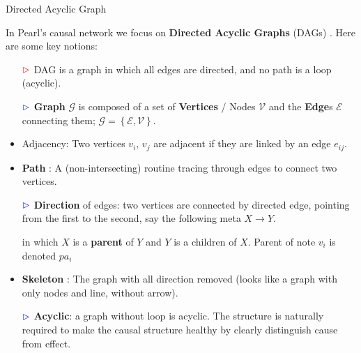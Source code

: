 \begin{point}
    Directed Acyclic Graph
\end{point}

In Pearl's causal network we focus on \textbf{Directed Acyclic Graphs} (DAGs) . Here are some key notions:
\begin{itemize}[topsep=2pt,itemsep=0pt]
    \item[$ \color{red}\vartriangleright  $] DAG is a graph in which all edges are directed, and no path is a loop (acyclic).
    \item[$ \color{blue}\vartriangleright  $] \textbf{Graph} $ \mathcal{G}$ is composed of a set of \textbf{Vertices}  / Nodes $\mathcal{V} $ and the \textbf{Edge}s $ \mathcal{E} $ connecting them; $\mathcal{G} = \left\{\mathcal{E},\mathcal{V}\right\} $.
    \item Adjacency: Two vertices $ v_i ,\,v_j$ are adjacent if they are linked by an edge $ e_{ij} $.
    \item \textbf{Path} : A (non-intersecting) routine tracing through edges to connect two vertices. 
    \item[$ \color{blue}\vartriangleright $] \textbf{Direction}  of edges: two vertices are connected by directed edge, pointing from the first to the second, say the following meta $ X\to Y $. 
    \begin{figure}[H]
        \centering          
        \end{figure}
    in which $ X $ is a \textbf{parent} of $ Y $ and $ Y $ is a children of $ X $. Parent of note $ v_i $ is denoted $ pa_i $
    \item \textbf{Skeleton} : The graph with all direction removed (looks like a graph with only nodes and line, without arrow).
    \item[$ \color{blue}\vartriangleright $]  \textbf{Acyclic}: a graph without loop is acyclic. The structure is naturally required to make the causal structure healthy by clearly distinguish cause from effect.
\end{itemize}

